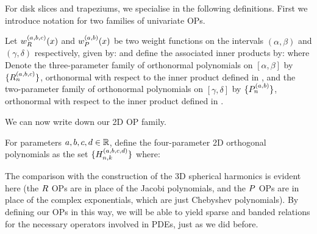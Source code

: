 For disk slices and trapeziums, we specialise  in the following definitions. First we introduce notation for two families of univariate OPs.
\begin{definition}\label{def:ds:OPconstruction}
	Let $w_R^{(a,b,c)}(x)$ and $w_P^{(a,b)}(x)$ be two weight functions on the intervals $(\alpha, \beta)$ and $(\gamma, \delta)$ respectively, given by:
and define the associated inner products by:
where
Denote the three-parameter family of orthonormal polynomials on $[\alpha,\beta]$ by $\{R_n^{(a,b,c)}\}$, orthonormal with respect to the inner product defined in , and the two-parameter family of orthonormal polynomials on $[\gamma,\delta]$ by $\{{P}_n^{(a,b)}\}$, orthonormal with respect to the inner product defined in .
\end{definition}

We can now write down our 2D OP family.
\begin{definition}\label{def:ds:constuction}
	For parameters $a,b,c,d \in \mathbb{R}$, define the four-parameter 2D orthogonal polynomials as the set $\{H_{n,k}^{(a,b,c,d)}\}$ where:
\end{definition}

The comparison with the construction of the 3D spherical harmonics is evident here (the $R$ OPs are in place of the Jacobi polynomials, and the ${P}$ OPs are in place of the complex exponentials, which are just Chebyshev polynomials). By defining our OPs in this way, we will be able to yield sparse and banded relations for the necessary operators involved in PDEs, just as we did before.

